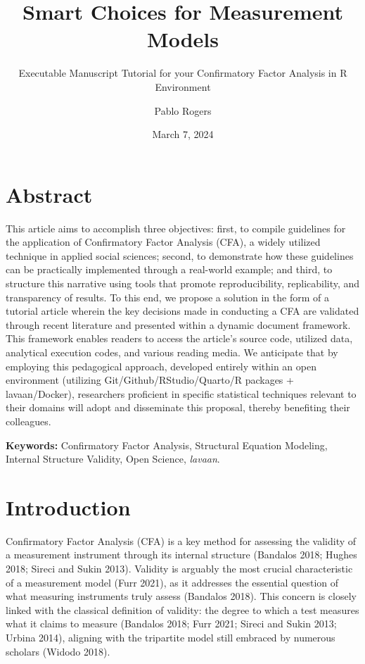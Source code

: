 \documentclass[
  a4paper,
]{article}
\title{Smart Choices for Measurement Models}
\subtitle{Executable Manuscript Tutorial for your Confirmatory Factor
Analysis in R Environment}
\author{Pablo Rogers}
\date{March 7, 2024}
\begin{document}
\maketitle


\section*{Abstract}\label{abstract}


This article aims to accomplish three objectives: first, to compile
guidelines for the application of Confirmatory Factor Analysis (CFA), a
widely utilized technique in applied social sciences; second, to
demonstrate how these guidelines can be practically implemented through
a real-world example; and third, to structure this narrative using tools
that promote reproducibility, replicability, and transparency of
results. To this end, we propose a solution in the form of a tutorial
article wherein the key decisions made in conducting a CFA are validated
through recent literature and presented within a dynamic document
framework. This framework enables readers to access the article's source
code, utilized data, analytical execution codes, and various reading
media. We anticipate that by employing this pedagogical approach,
developed entirely within an open environment (utilizing
Git/Github/RStudio/Quarto/R packages + lavaan/Docker), researchers
proficient in specific statistical techniques relevant to their domains
will adopt and disseminate this proposal, thereby benefiting their
colleagues.

\textbf{Keywords:} Confirmatory Factor Analysis, Structural Equation
Modeling, Internal Structure Validity, Open Science, \emph{lavaan}.


\section{Introduction}\label{introduction}

Confirmatory Factor Analysis (CFA) is a key method for assessing the
validity of a measurement instrument through its internal structure
(Bandalos 2018; Hughes 2018; Sireci and Sukin 2013). Validity is
arguably the most crucial characteristic of a measurement model (Furr
2021), as it addresses the essential question of what measuring
instruments truly assess (Bandalos 2018). This concern is closely linked
with the classical definition of validity: the degree to which a test
measures what it claims to measure (Bandalos 2018; Furr 2021; Sireci and
Sukin 2013; Urbina 2014), aligning with the tripartite model still
embraced by numerous scholars (Widodo 2018).
\end{document}
